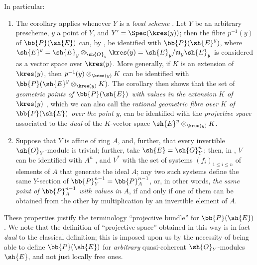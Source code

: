 In particular:
\begin{enumerate}
  \item The corollary  applies whenever $Y$ is a \emph{local scheme} .
    Let $Y$ be an arbitrary prescheme, $y$ a point of $Y$, and $Y'=\Spec(\kres(y))$;
    then the fibre $p^{-1}(y)$ of $\bb{P}(\sh{E})$ can, by , be identified with $\bb{P}(\sh{E}^y)$, where $\sh{E}^y = \sh{E}_y\otimes_{\sh{O}_y}\kres(y) = \sh{E}_y/\mathfrak{m}_y\sh{E}_y$ is considered as a vector space over $\kres(y)$.
    More generally, if $K$ is an extension of $\kres(y)$, then $p^{-1}(y)\otimes_{\kres(y)}K$ can be identified with $\bb{P}(\sh{E}^y\otimes_{\kres(y)}K)$.
    The corollary  then shows that the set of \emph{geometric points of $\bb{P}(\sh{E})$ with values in the extension $K$ of $\kres(y)$} , which we can also call the \emph{rational geometric fibre over $K$ of $\bb{P}(\sh{E})$ over the point $y$}, can be identified with the \emph{projective space} associated to the \emph{dual} of the $K$-vector space $\sh{E}^y\otimes_{\kres(y)}K$.
  \item Suppose that $Y$ is affine of ring $A$, and, further, that every invertible $\sh{O}_Y$-module is trivial;
    further, take $\sh{E}=\sh{O}_Y^n$;
    then, in , $V$ can be identified with $A^n$ , and $V^*$ with the set of systems $(f_i)_{1\leq i\leq n}$ of elements of $A$ that generate the ideal $A$;
    any two such systems define the same $Y$-section of $\bb{P}_Y^{n-1}=\bb{P}_A^{n-1}$, or, in other words, \emph{the same point of $\bb{P}_A^{n-1}$ with values in $A$}, if and only if one of them can be obtained from the other by multiplication by an invertible element of $A$.
\end{enumerate}

These properties justify the terminology ``projective bundle'' for $\bb{P}(\sh{E})$.
We note that the definition of ``projective space'' obtained in this way is in fact \emph{dual} to the classical definition;
this is imposed upon us by the necessity of being able to define $\bb{P}(\sh{E})$ for \emph{arbitrary} quasi-coherent $\sh{O}_Y$-modules $\sh{E}$, and not just locally free ones.

